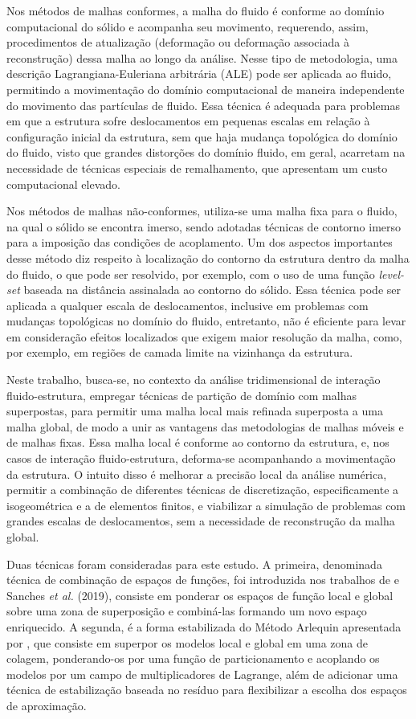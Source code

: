 Nos métodos de malhas conformes, a malha do fluido é conforme ao domínio computacional do sólido e acompanha seu movimento, requerendo, assim, procedimentos de atualização (deformação ou deformação associada à reconstrução) dessa malha ao longo da análise. Nesse tipo de metodologia, uma descrição Lagrangiana-Euleriana arbitrária (ALE) pode ser aplicada ao fluido, permitindo a movimentação do domínio computacional de maneira independente do movimento das partículas de fluido. Essa técnica é adequada para problemas em que a estrutura sofre deslocamentos em pequenas escalas em relação à configuração inicial da estrutura, sem que haja mudança topológica do domínio do fluido, visto que grandes distorções do domínio fluido, em geral, acarretam na necessidade de técnicas especiais de remalhamento, que apresentam um custo computacional elevado.

Nos métodos de malhas não-conformes, utiliza-se uma malha fixa para o fluido, na qual o sólido se encontra imerso, sendo adotadas técnicas de contorno imerso para a imposição das condições de acoplamento. Um dos aspectos importantes desse método diz respeito à localização do contorno da estrutura dentro da malha do fluido, o que pode ser resolvido, por exemplo, com o uso de uma função \textit{level-set} baseada na distância assinalada ao contorno do sólido. Essa técnica pode ser aplicada a qualquer escala de deslocamentos, inclusive em problemas com mudanças topológicas no domínio do fluido, entretanto, não é eficiente para levar em consideração efeitos localizados que exigem maior resolução da malha, como, por exemplo, em regiões de camada limite na vizinhança da estrutura.

Neste trabalho, busca-se, no contexto da análise tridimensional de interação fluido-estrutura, empregar técnicas de partição de domínio com malhas superpostas, para permitir uma malha local mais refinada superposta a uma malha global, de modo a unir as vantagens das metodologias de malhas móveis e de malhas fixas. Essa malha local é conforme ao contorno da estrutura, e, nos casos de interação fluido-estrutura, deforma-se acompanhando a movimentação da estrutura. O intuito disso é melhorar a precisão local da análise numérica, permitir a combinação de diferentes técnicas de discretização, especificamente a isogeométrica e a de elementos finitos, e viabilizar a simulação de problemas com grandes escalas de deslocamentos, sem a necessidade de reconstrução da malha global.

Duas técnicas foram consideradas para este estudo. A primeira, denominada técnica de combinação de espaços de funções, foi introduzida nos trabalhos de  e Sanches \textit{et al.} (2019), consiste em ponderar os espaços de função local e global sobre uma zona de superposição e combiná-las formando um novo espaço enriquecido. A segunda, é a forma estabilizada do Método Arlequin apresentada por , que consiste em superpor os modelos local e global em uma zona de colagem, ponderando-os por uma função de particionamento e acoplando os modelos por um campo de multiplicadores de Lagrange, além de adicionar uma técnica de estabilização baseada no resíduo para flexibilizar a escolha dos espaços de aproximação.

